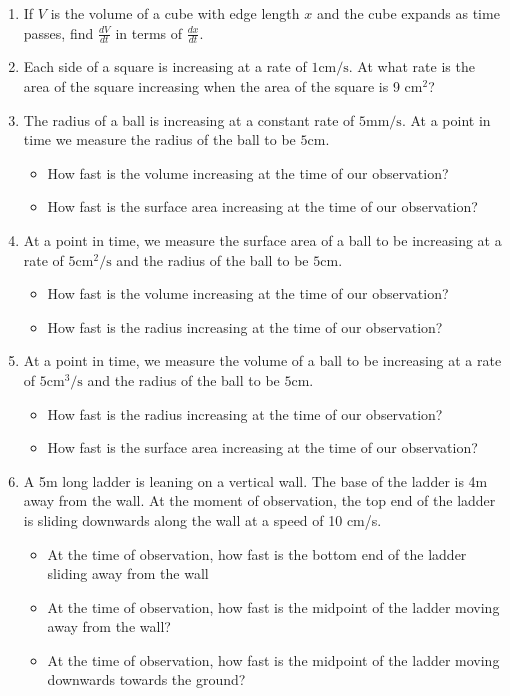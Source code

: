 \begin{enumerate}[ref={\fcProblemRef}]
\item \label{problemRelatedRatesCubeExpands}  If $V$ is the volume of a cube with edge length $x$ and the cube expands as time passes, find $\frac{dV}{dt}$ in terms of $\frac{dx}{dt}$.


\item \label{problemRelatedRatesSquareExpands} Each side of a square is increasing at a rate of $1\text{cm/s}$. At what rate is the area of the square increasing when the area of the square is 9 $\text{cm}^2$?
\item \label{problemRelatedRatesBallRadiusChanges} The radius of a ball is increasing at a constant rate of $5 \text{mm/s} $. At a point in time we measure the radius of the ball to be $5\text{cm}$.
\begin{itemize}
\item How fast is the volume increasing at the time of our observation?
\item How fast is the surface area increasing at the time of our observation?
\end{itemize}
\item \label{problemRelatedRatesBallSurfaceAreaChanges}  At a point in time, we measure the surface area of a ball to be increasing at a rate of $5\text{cm}^2/\text{s}$ and the radius of the ball to be $5 \text{cm}$.
\begin{itemize}
\item How fast is the volume increasing at the time of our observation?
\item How fast is the radius increasing at the time of our observation?
\end{itemize}
\item \label{problemRelatedRatesBallVolumeChanges} At a point in time, we measure the volume of a ball to be increasing at a rate of $5\text{cm}^3/\text{s}$ and the radius of the ball to be $5 \text{cm}$.
\begin{itemize}
\item How fast is the radius increasing at the time of our observation?
\item How fast is the surface area increasing at the time of our observation?
\end{itemize}

\item A 5m long ladder is leaning on a vertical wall. The base of the ladder is 4m away from the wall. At the moment of observation, the top end of the ladder is sliding downwards along the wall at a speed of 10 cm/s. 
\begin{itemize}
\item At the time of observation, how fast is the bottom end of the ladder sliding away from the wall 
\item At the time of observation, how fast is the midpoint of the ladder moving away from the wall?
\item At the time of observation, how fast is the midpoint of the ladder moving downwards towards the ground?


\end{itemize}
\end{enumerate}
